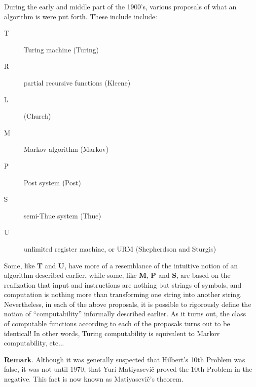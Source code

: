 \documentclass[12pt]{article}
\begin{document}
During the early and middle part of the 1900's, various proposals of what an algorithm is were put forth.  These include 
include:
\begin{description}
\item[T] Turing machine (Turing)
\item[R] partial recursive functions (Kleene)
\item[L]  (Church)
\item[M] Markov algorithm (Markov)
\item[P] Post system (Post)
\item[S] semi-Thue system (Thue)
\item[U] unlimited register machine, or URM (Shepherdson and Sturgis)
\end{description}
Some, like {\bf T} and {\bf U}, have more of a resemblance of the intuitive notion of an algorithm described earlier, while some, like {\bf M}, {\bf P} and {\bf S}, are based on the realization that input and instructions are nothing but strings of symbols, and computation is nothing more than transforming one string into another string.  Nevertheless, in each of the above proposals, it is possible to rigorously define the notion of ``computability'' informally described earlier.  As it turns out, the class of computable functions according to each of the proposals turns out to be identical!  In other words, Turing computability is equivalent to Markov computability, etc...

\textbf{Remark}.  Although it was generally suspected that Hilbert's 10th Problem was false, it was not until 1970, that Yuri Matiyasevi\v{c} proved the 10th Problem in the negative.  This fact is now known as Matiyasevi\v{c}'s theorem.
\end{document}
